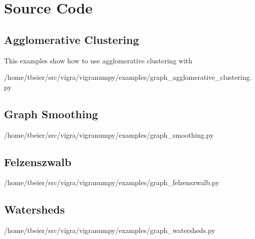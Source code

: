 
\pagestyle{empty}

\hfill

\vfill


\section*{Source Code}
\subsection*{Agglomerative Clustering}

This examples show how to use agglomerative clustering with 

{/home/tbeier/src/vigra/vigranumpy/examples/graph_agglomerative_clustering.py}
\newpage

\subsection*{Graph Smoothing}

{/home/tbeier/src/vigra/vigranumpy/examples/graph_smoothing.py}
\newpage

\subsection*{Felzenszwalb}

{/home/tbeier/src/vigra/vigranumpy/examples/graph_felzenszwalb.py}
\newpage

\subsection*{Watersheds}

{/home/tbeier/src/vigra/vigranumpy/examples/graph_watersheds.py}



 
\bigskip

\noindent\finalVersionString